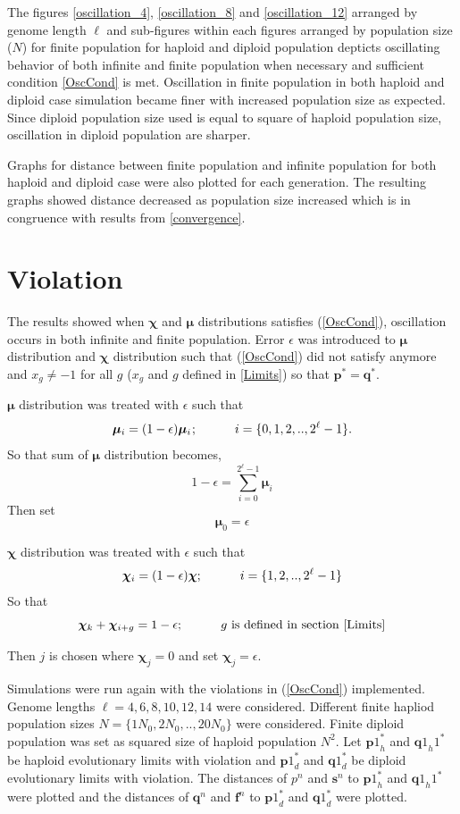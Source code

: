 The figures \ref{oscillation_4}, \ref{oscillation_8} and \ref{oscillation_12} arranged by genome length $\ell$ and 
sub-figures within each figures arranged by population size ($N$) for finite population for haploid and diploid population 
depticts oscillating behavior of both infinite and finite population when necessary and sufficient condition \ref{OscCond} is met. 
Oscillation in finite population in both haploid and diploid case simulation became finer with increased population size as expected. 
Since diploid population size used is equal to square of haploid population size, oscillation in diploid population are sharper.

Graphs for distance between finite population and infinite population for both haploid and diploid case were also plotted for each generation. 
The resulting graphs showed distance decreased as population size increased which is in congruence with results from \ref{convergence}.  

\section{Violation}
The results showed when $\bm{\chi}$ and $\bm{\mu}$ distributions satisfies (\ref{OscCond}), oscillation occurs in both infinite and finite population. 
Error $\epsilon$ was introduced to $\bm{\mu}$ distribution and $\bm{\chi}$ distribution such that (\ref{OscCond}) did not satisfy anymore and 
$x_g \neq −1$ for all $g$ ($x_g$ and $g$ defined in \ref{Limits}) so that $\bm{p}^\ast = \bm{q}^\ast$.

$\bm{\mu}$ distribution was treated with $\epsilon$ such that
\[
\bm{\mu}_i = (1-\epsilon) \bm{\mu}_i \hspace{0.01in}; \hspace{30pt} i = \{0, 1, 2,.., 2^{\ell}-1\}.
\]
So that sum of $\bm{\mu}$ distribution becomes, 
\[
1-\epsilon = \sum \limits_{i=0}^{2^{\ell}-1} \bm{\mu}_i
\]
Then set
\[
\bm{\mu}_0 = \epsilon
\]

$\bm{\chi}$ distribution was treated with $\epsilon$ such that
\[
\bm{\chi}_i = (1-\epsilon) \bm{\chi} ; \hspace{30pt} i = \{1, 2,.., 2^{\ell}-1\} 
\]
So that 
\[
\bm{\chi}_k + \bm{\chi}_{i+g} = 1-\epsilon ; \hspace{30pt} g \text{ is defined in  section } \ref{Limits}
\]

Then $j$ is chosen where $\bm{\chi}_j = 0$ and set $\bm{\chi}_j = \epsilon$. \newline

Simulations were run again with the violations in (\ref{OscCond}) implemented. Genome lengths $\ell = {4, 6, 8, 10, 12, 14}$ were considered. 
Different finite hapliod population sizes $N = \{1N_0, 2N_0,.., 20N_0\}$ were considered. Finite diploid population was set as 
squared size of haploid population $N^2$.\newline
Let ${\bm{p}1}_h^{\ast}$ and ${\bm{q}1}_h1^{\ast}$ be haploid evolutionary limits with violation and ${\bm{p}1}_d^{\ast}$ and ${\bm{q}1}_d^{\ast}$ be diploid 
evolutionary limits with violation. The distances of ${p}^n$ and $\bm{s}^n$ to ${\bm{p}1}_h^{\ast}$ and ${\bm{q}1}_h1^{\ast}$ were plotted and the distances of 
$\bm{q}^n$ and $\bm{f}^n$ to ${\bm{p}1}_d^{\ast}$ and ${\bm{q}1}_d^{\ast}$ were plotted.








